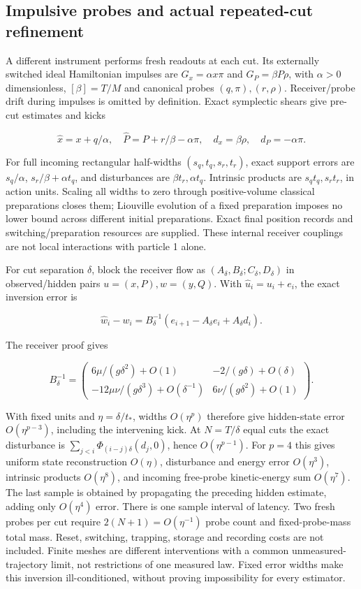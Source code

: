 \documentclass[11pt,a4paper]{article}
\begin{document}
\hypertarget{impulsive-probes-and-actual-repeated-cut-refinement}{%
\subsection{Impulsive probes and actual repeated-cut
refinement}\label{impulsive-probes-and-actual-repeated-cut-refinement}}

A different instrument performs fresh readouts at each cut. Its
externally switched ideal Hamiltonian impulses are \(G_x=\alpha x\pi\)
and \(G_P=\beta P\rho\), with \(\alpha>0\) dimensionless,
\([\beta]=T/M\) and canonical probes \((q,\pi),(r,\rho)\).
Receiver/probe drift during impulses is omitted by definition. Exact
symplectic shears give pre-cut estimates and kicks

\[\widehat x=x+q/\alpha,\quad
\widehat P=P+r/\beta-\alpha\pi,\quad
d_x=\beta\rho,\quad d_P=-\alpha\pi.\]

For full incoming rectangular half-widths \((s_q,t_q,s_r,t_r)\), exact
support errors are \(s_q/\alpha\), \(s_r/\beta+\alpha t_q\), and
disturbances are \(\beta t_r,\alpha t_q\). Intrinsic products are
\(s_qt_q,s_rt_r\), in action units. Scaling all widths to zero through
positive-volume classical preparations closes them; Liouville evolution
of a fixed preparation imposes no lower bound across different initial
preparations. Exact final position records and switching/preparation
resources are supplied. These internal receiver couplings are not local
interactions with particle 1 alone.

For cut separation \(\delta\), block the receiver flow as
\((A_\delta,B_\delta; C_\delta,D_\delta)\) in observed/hidden pairs
\(u=(x,P),w=(y,Q)\). With \(\widehat u_i=u_i+e_i\), the exact inversion
error is

\[\widehat w_i-w_i=B_\delta^{-1}
 (e_{i+1}-A_\delta e_i+A_\delta d_i).\]

The receiver proof gives

\[B_\delta^{-1}=\begin{pmatrix}
6\mu/(g\delta^2)+O(1)&-2/(g\delta)+O(\delta)\\
-12\mu\nu/(g\delta^3)+O(\delta^{-1})&6\nu/(g\delta^2)+O(1)
\end{pmatrix}.\]

With fixed units and \(\eta=\delta/t_*\), widths \(O(\eta^p)\) therefore
give hidden-state error \(O(\eta^{p-3})\), including the intervening
kick. At \(N=T/\delta\) equal cuts the exact disturbance is
\(\sum_{j<i}\Phi_{(i-j)\delta}(d_j,0)\), hence \(O(\eta^{p-1})\). For
\(p=4\) this gives uniform state reconstruction \(O(\eta)\), disturbance
and energy error \(O(\eta^3)\), intrinsic products \(O(\eta^8)\), and
incoming free-probe kinetic-energy sum \(O(\eta^7)\). The last sample is
obtained by propagating the preceding hidden estimate, adding only
\(O(\eta^4)\) error. There is one sample interval of latency. Two fresh
probes per cut require \(2(N+1)=O(\eta^{-1})\) probe count and
fixed-probe-mass total mass. Reset, switching, trapping, storage and
recording costs are not included. Finite meshes are different
interventions with a common unmeasured-trajectory limit, not
restrictions of one measured law. Fixed error widths make this inversion
ill-conditioned, without proving impossibility for every estimator.
\end{document}
